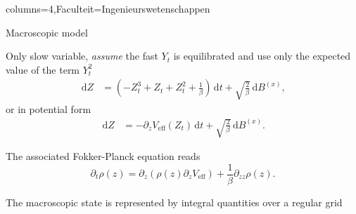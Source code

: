 \documentclass[portrait,a1paper,fontscale=0.45]{kuleuvenposter}
\newcommand{\dd}{\,\mathrm{d}}
\newcommand\eff{\mbox{eff}}
\begin{document}
\begin{poster}{columns=4,Faculteit=Ingenieurswetenschappen}
\begin{posterbox}[name=macroscopic, column=0,below=microscopic, above=bottom]{Macroscopic model}
\begin{noindentitemize}
\item Only slow variable, \emph{assume} the fast $Y_t$ is equilibrated and use only the expected value of the term $Y_t^2$
\begin{align}
\dd Z &= (-Z_t^3 + Z_t + Z_t^2 + \frac{1}{\beta}) \dd t + \sqrt{\frac{2}{\beta}} \dd B^{(x)}, \label{eq:zParisdyn}
\end{align}
or in potential form
\begin{align}
\dd Z &= -\partial_z V_{\eff} (Z_t) \dd t + \sqrt{\frac{2}{\beta}} \dd B^{(x)}. \label{eq:zParisdyn_pot}
\end{align}
%
\item The associated Fokker-Planck equation reads
\begin{equation}
\partial_t \rho(z) = \partial_z \left( \rho(z) \partial_z V_{\eff} \right) + \frac{1}{\beta} \partial_{zz} \rho(z).
\end{equation}
\item The macroscopic state is represented by integral quantities over a regular grid
\end{noindentitemize}
\end{posterbox}


\end{poster}
\end{document}
